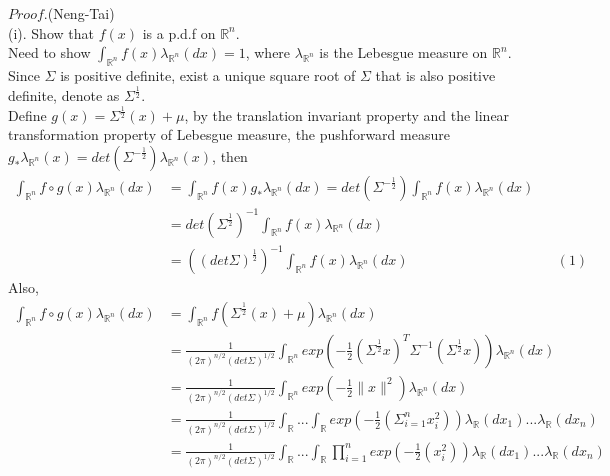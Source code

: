 \begin{answer}
$Proof.$(Neng-Tai)
\\(i). Show that $f(x)$ is a p.d.f on $\mathbb{R}^{n}$.
\\Need to show $\int_{\mathbb{R}^n}f(x)\lambda_{\mathbb{R}^n}(dx) =1$, where $\lambda_{\mathbb{R}^n}$ is the Lebesgue measure on $\mathbb{R}^n$.
\\Since $\Sigma$ is positive definite, exist a unique square root of $\Sigma$ that is also positive definite, denote as $\Sigma^{\frac{1}{2}}$.
\\Define $ g(x) = \Sigma^{\frac{1}{2}}(x)+\mu$, by the translation invariant property and the linear transformation property of Lebesgue measure, the pushforward measure $g_{\ast}\lambda_{\mathbb{R}^n}(x) = det(\Sigma^{-\frac{1}{2}}) \lambda_{\mathbb{R}^n}(x)$, then\\
\begin{equation*}
    \begin{aligned}
        \int_{\mathbb{R}^n} f \circ g (x)\lambda_{\mathbb{R}^n}(dx)&= \int_{\mathbb{R}^n} f(x)g_{\ast}\lambda_{\mathbb{R}^n}(dx)= det(\Sigma^{-\frac{1}{2}})\int_{\mathbb{R}^n} f(x)\lambda_{\mathbb{R}^n}(dx)
        \\&= det(\Sigma^{\frac{1}{2}})^{-1}\int_{\mathbb{R}^n} f(x)\lambda_{\mathbb{R}^n}(dx)
        \\&= ((det\Sigma)^{\frac{1}{2}})^{-1}\int_{\mathbb{R}^n} f(x)\lambda_{\mathbb{R}^n}(dx)&&(1)
    \end{aligned}
\end{equation*}
Also,\\
\begin{equation*}
    \begin{aligned}
        \int_{\mathbb{R}^n} f \circ g (x)\lambda_{\mathbb{R}^n}(dx) 
        &= \int_{\mathbb{R}^n} f(\Sigma^{\frac{1}{2}} (x)+\mu)\lambda_{\mathbb{R}^n}(dx) 
        \\&= \frac{1}{(2 \pi )^{n/2}(det \Sigma)^{1/2}} \int_{\mathbb{R}^n} exp(-\frac{1}{2}(\Sigma^{\frac{1}{2}}x)^{T}\Sigma^{-1}(\Sigma^{\frac{1}{2}}x))\lambda_{\mathbb{R}^n}(dx) 
        \\&= \frac{1}{(2 \pi )^{n/2}(det \Sigma)^{1/2}}\int_{\mathbb{R}^n} exp(-\frac{1}{2} \| x \|^2)\lambda_{\mathbb{R}^n}(dx)
        \\&= \frac{1}{(2 \pi )^{n/2}(det \Sigma)^{1/2}}\int_{\mathbb{R}}...\int_{\mathbb{R}} exp(-\frac{1}{2} (\Sigma_{i=1}^{n} x_i^2))\lambda_{\mathbb{R}}(dx_1)...\lambda_{\mathbb{R}}(dx_n)
        \\&= \frac{1}{(2 \pi )^{n/2}(det \Sigma)^{1/2}}\int_{\mathbb{R}}...\int_{\mathbb{R}} \prod _{i=1}^{n}exp(-\frac{1}{2} ( x_i^2))\lambda_{\mathbb{R}}(dx_1)...\lambda_{\mathbb{R}}(dx_n)

\end{aligned}
\end{equation*}
\end{answer}
